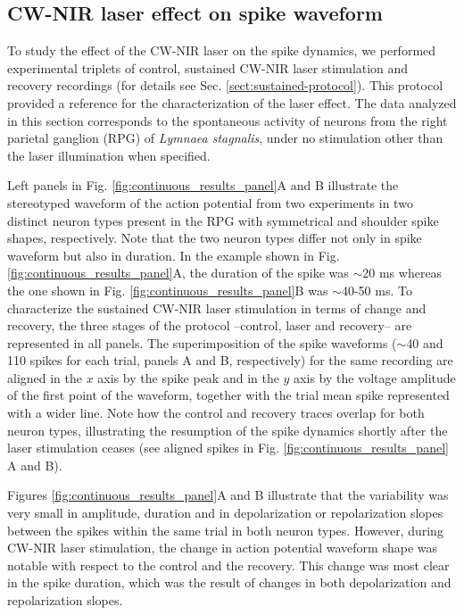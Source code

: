 
\subsection{CW-NIR laser effect on spike waveform}
To study the effect of the CW-NIR laser on the spike dynamics, we performed experimental triplets of control, sustained CW-NIR laser stimulation and recovery recordings (for details see Sec. \ref{sect:sustained-protocol}). This protocol provided a reference for the characterization of the laser effect. The data analyzed in this section corresponds to the spontaneous activity of neurons from the right parietal ganglion (RPG) of \textit{Lymnaea stagnalis}, under no stimulation other than the laser illumination when specified.

Left panels in Fig. \ref{fig:continuous_results_panel}A and B illustrate the stereotyped waveform of the action potential from two experiments in two distinct neuron types present in the RPG with symmetrical and shoulder spike shapes, respectively. Note that the two neuron types differ not only in spike waveform but also in duration. In the example shown in Fig. \ref{fig:continuous_results_panel}A, the duration of the spike was $\sim$20 ms whereas the one shown in Fig. \ref{fig:continuous_results_panel}B was $\sim$40-50 ms. To characterize the sustained CW-NIR laser stimulation in terms of change and recovery, the three stages of the protocol --control, laser and recovery-- are represented in all panels. The superimposition of the spike waveforms ($\sim$40 and 110 spikes for each trial, panels A and B, respectively) for the same recording are aligned in the $x$ axis by the spike peak and in the $y$ axis by the voltage amplitude of the first point of the waveform, together with the trial mean spike represented with a wider line. Note how the control and recovery traces overlap for both neuron types, illustrating the resumption of the spike dynamics shortly after the laser stimulation ceases (see aligned spikes in Fig. \ref{fig:continuous_results_panel} A and B).

Figures \ref{fig:continuous_results_panel}A and B illustrate that the variability was very small in amplitude, duration and in depolarization or repolarization slopes between the spikes within the same trial in both neuron types. However, during CW-NIR laser stimulation, the change in action potential waveform shape was notable with respect to the control and the recovery. This change was most clear in the spike duration, which was the result of changes in both depolarization and repolarization slopes. 

